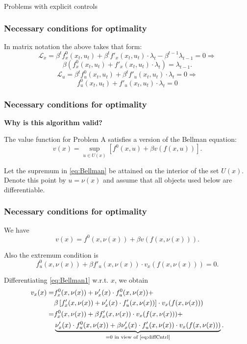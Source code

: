 \documentclass[10pt]{beamer}
\theoremstyle{definition}
\begin{document}
\begin{section}{Problems with explicit controls}
\begin{frame}[fragile]
\frametitle{Necessary conditions for optimality}
In matrix notation the above takes that form:
\[ \mathcal{L}_x = \beta^t f^0_x(x_t,u_t)+\beta^t f'_x(x_t,u_t)\cdot \lambda_t - \beta^{t-1}\lambda_{t-1} = 0 \Rightarrow \]
\begin{equation}
\beta ( f^0_x(x_t,u_t)+ f'_x(x_t,u_t)\cdot \lambda_t ) = \lambda_{t-1}.
\label{eq:LagrX}
\end{equation}  \bigskip
\[ \mathcal{L}_u = \beta^t f^0_u (x_t,u_t)+ \beta^t f'_u(x_t,u_t)\cdot \lambda_t = 0 \Rightarrow \]
\begin{equation}
f^0_u (x_t,u_t)+ f'_u(x_t,u_t)\cdot \lambda_t = 0
\label{eq:LagrU}
\end{equation}
\end{frame}



\begin{frame}[fragile]
\frametitle{Necessary conditions for optimality}
\textbf{Why is this algorithm valid?}\bigskip \bigskip

The value function for Problem A satisfies a version of the Bellman equation:
\begin{equation}
v(x) = \sup_{u \in U(x)}  \left[
f^0(x,u)+\beta v(f(x,u)) \right]. \label{eq:Bellman}
\end{equation}


Let the supremum in \eqref{eq:Bellman} be attained on the interior of the set $ U(x) $. Denote this point by $ u = \nu(x) $ and assume that all objects used below are differentiable.
\end{frame}



\begin{frame}[fragile]
\frametitle{Necessary conditions for optimality}
We have \begin{equation}
 v(x) = f^0(x,\nu(x)) + \beta v(f(x,\nu(x))) .
\label{eq:Bellman1}
\end{equation}

Also the extremum condition is \begin{equation}
f^0_u(x,\nu(x)) + \beta f'_u(x,\nu(x)) \cdot v_x(f(x,\nu(x))) = 0.
\label{eq:diffCntrl}
\end{equation} 

Differentiating \eqref{eq:Bellman1} w.r.t. $ x $, we obtain
\begin{equation*}
\begin{split}
 v_x(x) = & f^0_x(x,\nu(x)) +  \nu'_x(x) \cdot f^0_u(x,\nu(x)) + \\
 & \beta \left[ f'_x(x,\nu(x)) + \nu'_x(x) \cdot f'_u(x,\nu(x))  \right]\cdot v_x(f(x,\nu(x)))\\
 = & f^0_x(x,\nu(x)) + \beta  f'_x(x,\nu(x))\cdot v_x(f(x,\nu(x))) + \\
 &  \underbrace{\nu'_x(x) \cdot f^0_u(x,\nu(x)) + \beta \nu'_x(x) \cdot f'_u(x,\nu(x)) \cdot v_x(f(x,\nu(x)))}_{=0 \text{ in view of \eqref{eq:diffCntrl}}}.
\end{split}
\end{equation*}
\end{frame}



\end{section}
\end{document}
